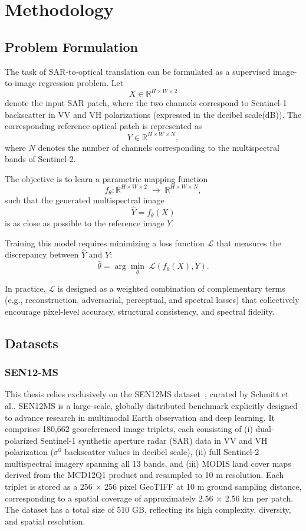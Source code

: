 \chapter{Methodology}
\section{Problem Formulation}

The task of SAR-to-optical translation can be formulated as a supervised image-to-image regression problem. Let
\[
X \in \mathbb{R}^{H \times W \times 2}
\]
denote the input SAR patch, where the two channels correspond to Sentinel-1 backscatter in VV and VH polarizations (expressed in the decibel scale(dB)). The corresponding reference optical patch is represented as
\[
Y \in \mathbb{R}^{H \times W \times N},
\]
where \(N\) denotes the number of channels corresponding to the multispectral bands of {Sentinel-2}.

The objective is to learn a parametric mapping function
\[
f_\theta : \mathbb{R}^{H \times W \times 2} \; \rightarrow \; \mathbb{R}^{H \times W \times N},
\]
such that the generated multispectral image
\[
\hat{Y} = f_\theta(X)
\]
is as close as possible to the reference image \( Y \).

Training this model requires minimizing a loss function \(\mathcal{L}\) that measures the discrepancy between \(\hat{Y}\) and \(Y\):
\[
\hat{\theta} = \arg\min_\theta \; \mathcal{L}(f_\theta(X), Y).
\]

In practice, \(\mathcal{L}\) is designed as a weighted combination of complementary terms (e.g., reconstruction, adversarial, perceptual, and spectral losses) that collectively encourage pixel-level accuracy, structural consistency, and spectral fidelity.

\section{Datasets}
\label{sec:datasets}
\subsection{SEN12-MS}
This thesis relies exclusively on the SEN12MS dataset~\cite{sen12ms_2019}, curated by Schmitt et al.. SEN12MS is a large-scale, globally distributed benchmark explicitly designed to advance research in multimodal Earth observation and deep learning. It comprises 180,662 georeferenced image triplets, each consisting of (i) dual-polarized Sentinel-1 synthetic aperture radar (SAR) data in VV and VH polarization ($\sigma^{0}$ backscatter values in decibel scale), (ii) full Sentinel-2 multispectral imagery spanning all 13 bands, and (iii) MODIS land cover maps derived from the MCD12Q1 product and resampled to 10 m resolution. Each triplet is stored as a 256 × 256 pixel GeoTIFF at 10 m ground sampling distance, corresponding to a spatial coverage of approximately 2.56 × 2.56 km per patch. The dataset has a total size of 510 GB, reflecting its high complexity, diversity, and spatial resolution.

